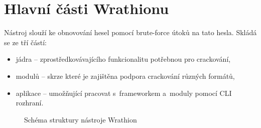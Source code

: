 \section{Hlavní části Wrathionu}
Nástroj slouží ke obnovování hesel pomocí brute-force útoků na tato hesla. Skládá se ze tří
částí:
\begin{itemize}
	\item jádra -- zprostředkovávajícího funkcionalitu potřebnou pro crackování,
	\item modulů -- skrze které je zajištěna podpora crackování různých formátů,
	\item aplikace -- umožňující pracovat s~frameworkem a~moduly pomocí CLI rozhraní.
\end{itemize}
\begin{figure}[ht]
    \begin{center}
    \end{center}
    \caption{Schéma struktury nástroje Wrathion \cite{Hranicky}}
    \label{memory}
\end{figure}
